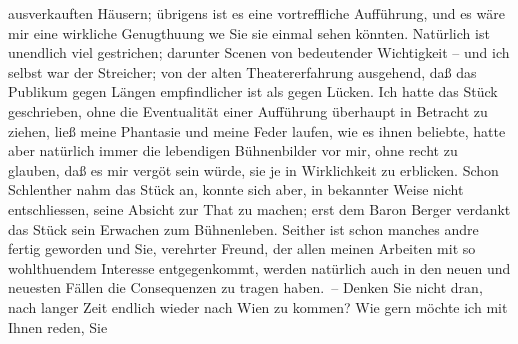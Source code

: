 \begin{ledgroupsized}[t]{13cm}
                    ausverkauften Häusern; übrigens ist es eine vortreffliche Aufführung, und es
                    wäre mir eine wirkliche Genugthuung we{\geminationn}
               Sie sie
                    einmal sehen könnten. Natürlich ist unendlich viel gestrichen; darunter Scenen
                    von bedeutender Wichtigkeit – und ich selbst war der Streicher; von der alten
                    Theatererfahrung ausgehend, daß das Publikum gegen Längen empfindlicher ist als
                    gegen Lücken. Ich hatte das Stück geschrieben, ohne die Eventualität einer
                    Aufführung überhaupt in Betracht zu ziehen, ließ meine Phantasie und meine Feder
                    laufen, wie es ihnen beliebte, {\pb}hatte aber
                    natürlich immer die lebendigen Bühnenbilder vor mir, ohne recht zu glauben, daß
                    es mir vergö{\geminationn}t sein würde, sie je in Wirklichkeit
                    zu erblicken. Schon Schlenther nahm das Stück an, konnte sich aber,
                    in bekannter Weise nicht entschliessen, seine Absicht zur That zu machen; erst
                    dem Baron Berger verdankt  das Stück
               sein Erwachen zum Bühnenleben. Seither ist
                    schon manches andre fertig geworden und Sie, verehrter Freund, der allen meinen
                    Arbeiten mit so wohlthuendem Interesse entgegenkommt, werden natürlich auch in
                    den neuen und neuesten Fällen die Consequenzen zu tragen haben. –\pend
           \pstart
           Denken Sie nicht dran, nach langer Zeit endlich wieder nach Wien zu kommen? Wie gern möchte ich mit Ihnen reden, Sie

\end{ledgroupsized}
